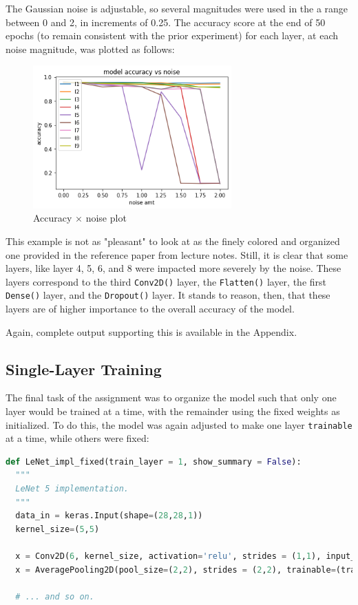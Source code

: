 \documentclass{article}
\begin{document}
The Gaussian noise is adjustable, so several magnitudes were used in the a range between 0 and 2, in increments of 0.25.
The accuracy score at the end of 50 epochs (to remain consistent with the prior experiment) for each layer, at each noise magnitude, was plotted as follows:

\begin{figure}[H]
    \centering
    \includegraphics[width=3in]{csci-8920/hw-2/images/accuracy-noise.png}
    \caption{Accuracy $\times$ noise plot}
    \label{fig:mnist}
\end{figure}

This example is not as "pleasant" to look at as the finely colored and organized one provided in the reference paper from lecture notes.
Still, it is clear that some layers, like layer 4, 5, 6, and 8 were impacted more severely by the noise.
These layers correspond to the third \lstinline{Conv2D()} layer, the \lstinline{Flatten()} layer, the first \lstinline{Dense()} layer, and the \lstinline{Dropout()} layer.
It stands to reason, then, that these layers are of higher importance to the overall accuracy of the model.

Again, complete output supporting this is available in the  Appendix.

\subsection{Single-Layer Training}

The final task of the assignment was to organize the model such that only one layer would be trained at a time, with the remainder using the fixed weights as initialized.
To do this, the model was again adjusted to make one layer \lstinline{trainable} at a time, while others were fixed:

\begin{lstlisting}[language=Python]
def LeNet_impl_fixed(train_layer = 1, show_summary = False):
  """
  LeNet 5 implementation.
  """
  data_in = keras.Input(shape=(28,28,1))
  kernel_size=(5,5)

  x = Conv2D(6, kernel_size, activation='relu', strides = (1,1), input_shape= (28,28,1), padding='same', trainable=(train_layer == 1))(data_in)
  x = AveragePooling2D(pool_size=(2,2), strides = (2,2), trainable=(train_layer == 2))(x)
  
  # ... and so on.
\end{lstlisting}
\end{document}
